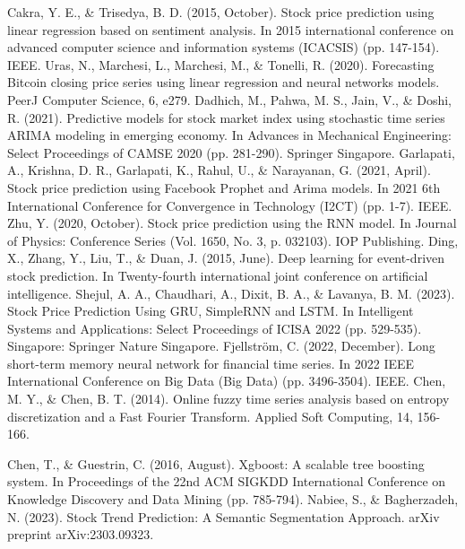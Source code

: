 \documentclass{ieeeojies}
\begin{document}
\begin{thebibliography}{00}
Cakra, Y. E., \& Trisedya, B. D. (2015, October). Stock price prediction using linear regression based on sentiment analysis. In 2015 international conference on advanced computer science and information systems (ICACSIS) (pp. 147-154). IEEE.
Uras, N., Marchesi, L., Marchesi, M., \& Tonelli, R. (2020). Forecasting Bitcoin closing price series using linear regression and neural networks models. PeerJ Computer Science, 6, e279.
Dadhich, M., Pahwa, M. S., Jain, V., \& Doshi, R. (2021). Predictive models for stock market index using stochastic time series ARIMA modeling in emerging economy. In Advances in Mechanical Engineering: Select Proceedings of CAMSE 2020 (pp. 281-290). Springer Singapore.
Garlapati, A., Krishna, D. R., Garlapati, K., Rahul, U., \& Narayanan, G. (2021, April). Stock price prediction using Facebook Prophet and Arima models. In 2021 6th International Conference for Convergence in Technology (I2CT) (pp. 1-7). IEEE.
Zhu, Y. (2020, October). Stock price prediction using the RNN model. In Journal of Physics: Conference Series (Vol. 1650, No. 3, p. 032103). IOP Publishing.
Ding, X., Zhang, Y., Liu, T., \& Duan, J. (2015, June). Deep learning for event-driven stock prediction. In Twenty-fourth international joint conference on artificial intelligence.
Shejul, A. A., Chaudhari, A., Dixit, B. A., \& Lavanya, B. M. (2023). Stock Price Prediction Using GRU, SimpleRNN and LSTM. In Intelligent Systems and Applications: Select Proceedings of ICISA 2022 (pp. 529-535). Singapore: Springer Nature Singapore.
Fjellström, C. (2022, December). Long short-term memory neural network for financial time series. In 2022 IEEE International Conference on Big Data (Big Data) (pp. 3496-3504). IEEE.
Chen, M. Y., \& Chen, B. T. (2014). Online fuzzy time series analysis based on entropy discretization and a Fast Fourier Transform. Applied Soft Computing, 14, 156-166.

Chen, T., & Guestrin, C. (2016, August). Xgboost: A scalable tree boosting system. In Proceedings of the 22nd ACM SIGKDD International Conference on Knowledge Discovery and Data Mining (pp. 785-794).
Nabiee, S., \& Bagherzadeh, N. (2023). Stock Trend Prediction: A Semantic Segmentation Approach. arXiv preprint arXiv:2303.09323.



\end{thebibliography}
\end{document}
